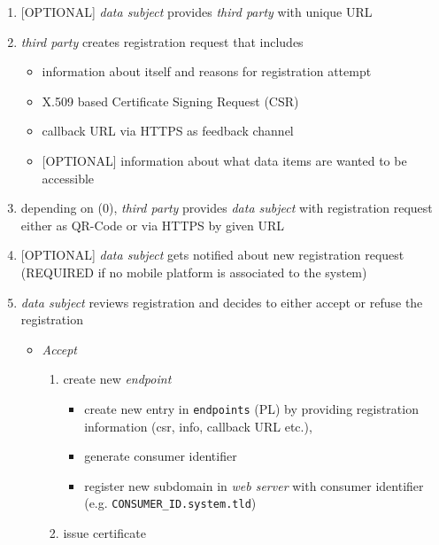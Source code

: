 \documentclass[12pt,english,a4paper,titlepage,cleardoublepage=empty,dottedtoc]{report}
\providecommand{\tightlist}{%
  \setlength{\itemsep}{0pt}\setlength{\parskip}{0pt}}
\begin{document}
\begin{enumerate}
\def\labelenumi{\arabic{enumi}.}
\setcounter{enumi}{-1}
\item
  {[}OPTIONAL{]} \emph{data subject} provides \emph{third party} with
  unique URL
\item
  \emph{third party} creates registration request that includes

  \begin{itemize}
  \tightlist
  \item
    information about itself and reasons for registration attempt
  \item
    X.509 based Certificate Signing Request (CSR)
  \item
    callback URL via HTTPS as feedback channel
  \item
    {[}OPTIONAL{]} information about what data items are wanted to be
    accessible
  \end{itemize}
\item
  depending on (0), \emph{third party} provides \emph{data subject} with
  registration request either as QR-Code or via HTTPS by given URL
\item
  {[}OPTIONAL{]} \emph{data subject} gets notified about new
  registration request (REQUIRED if no mobile platform is associated to
  the system)
\item
  \emph{data subject} reviews registration and decides to either accept
  or refuse the registration

  \begin{itemize}
  \tightlist
  \item
    \emph{Accept}

    \begin{enumerate}
    \def\labelenumii{\arabic{enumii})}
    \tightlist
    \item
      create new \emph{endpoint}

      \begin{itemize}
      \tightlist
      \item
        create new entry in \texttt{endpoints} (PL) by providing
        registration information (csr, info, callback URL etc.),
      \item
        generate consumer identifier
      \item
        register new subdomain in \emph{web server} with consumer
        identifier (e.g. \texttt{CONSUMER\_ID.system.tld})
      \end{itemize}
    \item
      issue certificate


\end{enumerate}
\end{itemize}
\end{enumerate}
\end{document}
